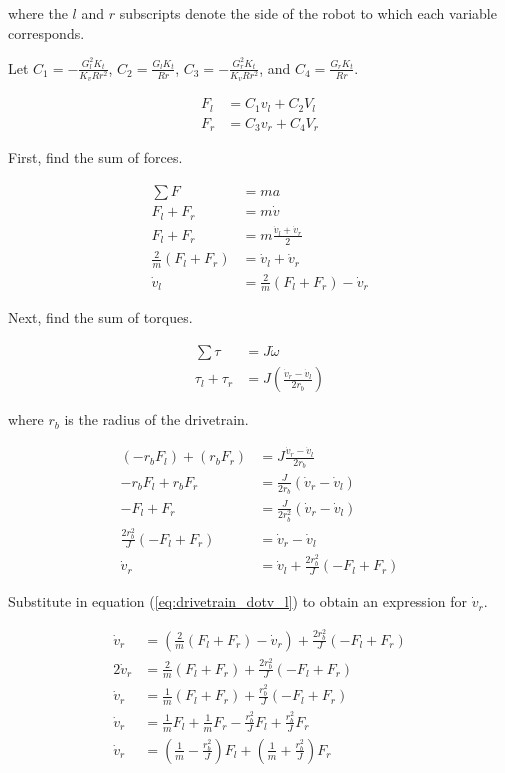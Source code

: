 where the $l$ and $r$ subscripts denote the side of the robot to which each
variable corresponds.

Let $C_1 = -\frac{G_l^2 K_t}{K_v R r^2}$, $C_2 = \frac{G_l K_t}{Rr}$,
$C_3 = -\frac{G_r^2 K_t}{K_v R r^2}$, and $C_4 = \frac{G_r K_t}{Rr}$.

\begin{align}
  F_l &= C_1 v_l + C_2 V_l \label{eq:drivetrain_Fl} \\
  F_r &= C_3 v_r + C_4 V_r \label{eq:drivetrain_Fr}
\end{align}

First, find the sum of forces.

\begin{align}
  \sum F &= ma \nonumber \\
  F_l + F_r &= m \dot{v} \nonumber \\
  F_l + F_r &= m \frac{\dot{v}_l + \dot{v}_r}{2} \nonumber \\
  \frac{2}{m} (F_l + F_r) &= \dot{v}_l + \dot{v}_r \nonumber \\
  \dot{v}_l &= \frac{2}{m} (F_l + F_r) - \dot{v}_r \label{eq:drivetrain_dotv_l}
\end{align}

Next, find the sum of torques.

\begin{align*}
  \sum \tau &= J \dot{\omega} \\
  \tau_l + \tau_r &= J \left(\frac{\dot{v}_r - \dot{v}_l}{2 r_b}\right)
\end{align*}

where $r_b$ is the radius of the drivetrain.

\begin{align*}
  (-r_b F_l) + (r_b F_r) &= J \frac{\dot{v}_r - \dot{v}_l}{2 r_b} \\
  -r_b F_l + r_b F_r &= \frac{J}{2 r_b} (\dot{v}_r - \dot{v}_l) \\
  -F_l + F_r &= \frac{J}{2 r_b^2} (\dot{v}_r - \dot{v}_l) \\
  \frac{2 r_b^2}{J} (-F_l + F_r) &= \dot{v}_r - \dot{v}_l \\
  \dot{v}_r &= \dot{v}_l + \frac{2 r_b^2}{J} (-F_l + F_r)
\end{align*}

Substitute in equation (\ref{eq:drivetrain_dotv_l}) to obtain an expression for
$\dot{v}_r$.

\begin{align}
  \dot{v}_r &= \left(\frac{2}{m} (F_l + F_r) - \dot{v}_r\right) +
    \frac{2 r_b^2}{J} (-F_l + F_r) \nonumber \\
  2\dot{v}_r &= \frac{2}{m} (F_l + F_r) + \frac{2 r_b^2}{J} (-F_l + F_r)
    \nonumber \\
  \dot{v}_r &= \frac{1}{m} (F_l + F_r) + \frac{r_b^2}{J} (-F_l + F_r)
    \label{eq:drivetrain_vr_2mid} \\
  \dot{v}_r &= \frac{1}{m} F_l + \frac{1}{m} F_r - \frac{r_b^2}{J} F_l +
    \frac{r_b^2}{J} F_r \nonumber \\
  \dot{v}_r &= \left(\frac{1}{m} - \frac{r_b^2}{J}\right) F_l +
    \left(\frac{1}{m} + \frac{r_b^2}{J}\right) F_r \label{eq:drivetrain_vr_2}
\end{align}

